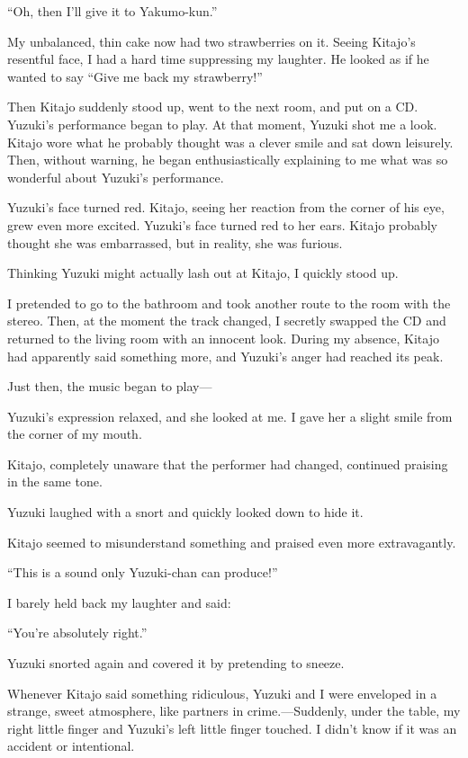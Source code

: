 \documentclass[
    a4paper,
    12pt,
    twoside,
    openany,
    UTF8,
    fontset=windows
]{ctexbook}
\begin{document}
``Oh, then I'll give it to Yakumo-kun.''

My unbalanced, thin cake now had two strawberries on it. Seeing Kitajo's resentful face, I had a hard time suppressing my laughter. He looked as if he wanted to say ``Give me back my strawberry!''

Then Kitajo suddenly stood up, went to the next room, and put on a CD. Yuzuki's performance began to play. At that moment, Yuzuki shot me a look. Kitajo wore what he probably thought was a clever smile and sat down leisurely. Then, without warning, he began enthusiastically explaining to me what was so wonderful about Yuzuki's performance.

Yuzuki's face turned red. Kitajo, seeing her reaction from the corner of his eye, grew even more excited. Yuzuki's face turned red to her ears. Kitajo probably thought she was embarrassed, but in reality, she was furious.

Thinking Yuzuki might actually lash out at Kitajo, I quickly stood up.

I pretended to go to the bathroom and took another route to the room with the stereo. Then, at the moment the track changed, I secretly swapped the CD and returned to the living room with an innocent look. During my absence, Kitajo had apparently said something more, and Yuzuki's anger had reached its peak.

Just then, the music began to play---

Yuzuki's expression relaxed, and she looked at me. I gave her a slight smile from the corner of my mouth.

Kitajo, completely unaware that the performer had changed, continued praising in the same tone.

Yuzuki laughed with a snort and quickly looked down to hide it.

Kitajo seemed to misunderstand something and praised even more extravagantly.

``This is a sound only Yuzuki-chan can produce!''

I barely held back my laughter and said:

``You're absolutely right.''

Yuzuki snorted again and covered it by pretending to sneeze.

Whenever Kitajo said something ridiculous, Yuzuki and I were enveloped in a strange, sweet atmosphere, like partners in crime.---Suddenly, under the table, my right little finger and Yuzuki's left little finger touched. I didn't know if it was an accident or intentional.
\end{document}
